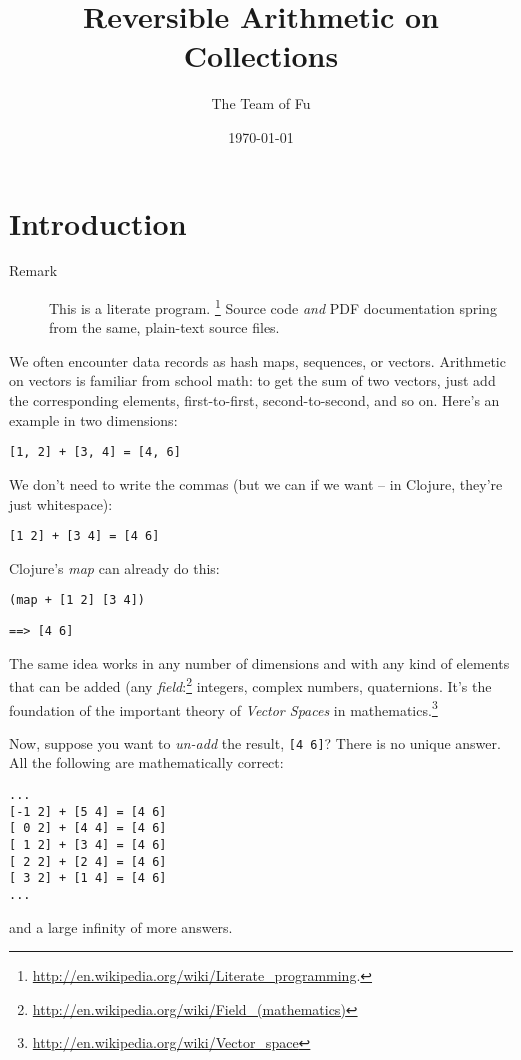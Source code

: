 \documentclass[11pt]{article}
\author{The Team of Fu}
\date{\today}
\title{Reversible Arithmetic on Collections}
\begin{document}
\maketitle
\tableofcontents


\section{Introduction}
\label{sec-1}
\begin{description}
\item[{Remark}] This is a literate program.
\footnote{\url{http://en.wikipedia.org/wiki/Literate_programming}.}
Source code \emph{and} PDF documentation spring
from the same, plain-text source files.
\end{description}

We often encounter data records as hash maps, sequences, or vectors.
Arithmetic on vectors is familiar from school math: to get the sum of
two vectors, just add the corresponding elements, first-to-first,
second-to-second, and so on.  Here's an example in two dimensions:
\begin{verbatim}
[1, 2] + [3, 4] = [4, 6]
\end{verbatim}

We don't need to write the commas (but we can if we want -- in Clojure,
they're just whitespace):
\begin{verbatim}
[1 2] + [3 4] = [4 6]
\end{verbatim}

Clojure's \emph{map} can already do this:
\begin{verbatim}
(map + [1 2] [3 4])
\end{verbatim}
\begin{verbatim}
==> [4 6]
\end{verbatim}

The same idea works in any number of dimensions and with any kind of
elements that can be added (any
\emph{field}:\footnote{\url{http://en.wikipedia.org/wiki/Field_(mathematics)}} integers,
complex numbers, quaternions.  It's the foundation of the important
theory of \emph{Vector Spaces} in
mathematics.\footnote{\url{http://en.wikipedia.org/wiki/Vector_space}}

Now, suppose you want to \emph{un-add} the result, \verb|[4 6]|? There is no
unique answer.  All the following are mathematically correct:
\begin{verbatim}
...
[-1 2] + [5 4] = [4 6]
[ 0 2] + [4 4] = [4 6]
[ 1 2] + [3 4] = [4 6]
[ 2 2] + [2 4] = [4 6]
[ 3 2] + [1 4] = [4 6]
...
\end{verbatim}
and a large infinity of more answers.
\end{document}
